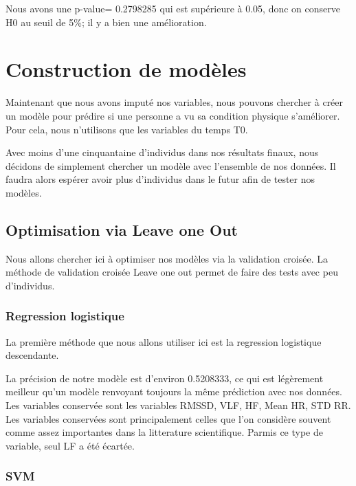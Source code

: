 \documentclass[]{article}
\begin{document}
Nous avons une p-value= 0.2798285 qui est supérieure à 0.05, donc on
conserve H0 au seuil de 5\%; il y a bien une amélioration.

\hypertarget{construction-de-moduxe8les}{%
\section{Construction de modèles}\label{construction-de-moduxe8les}}

Maintenant que nous avons imputé nos variables, nous pouvons chercher à
créer un modèle pour prédire si une personne a vu sa condition physique
s'améliorer. Pour cela, nous n'utilisons que les variables du temps T0.

Avec moins d'une cinquantaine d'individus dans nos résultats finaux,
nous décidons de simplement chercher un modèle avec l'ensemble de nos
données. Il faudra alors espérer avoir plus d'individus dans le futur
afin de tester nos modèles.

\hypertarget{optimisation-via-leave-one-out}{%
\subsection{Optimisation via Leave one
Out}\label{optimisation-via-leave-one-out}}

Nous allons chercher ici à optimiser nos modèles via la validation
croisée. La méthode de validation croisée Leave one out permet de faire
des tests avec peu d'individus.

\hypertarget{regression-logistique-1}{%
\subsubsection{Regression logistique}\label{regression-logistique-1}}

La première méthode que nous allons utiliser ici est la regression
logistique descendante.

La précision de notre modèle est d'environ 0.5208333, ce qui est
légèrement meilleur qu'un modèle renvoyant toujours la même prédiction
avec nos données. Les variables conservée sont les variables RMSSD, VLF,
HF, Mean HR, STD RR. Les variables conservées sont principalement celles
que l'on considère souvent comme assez importantes dans la litterature
scientifique. Parmis ce type de variable, seul LF a été écartée.

\hypertarget{svm-1}{%
\subsubsection{SVM}\label{svm-1}}
\end{document}
